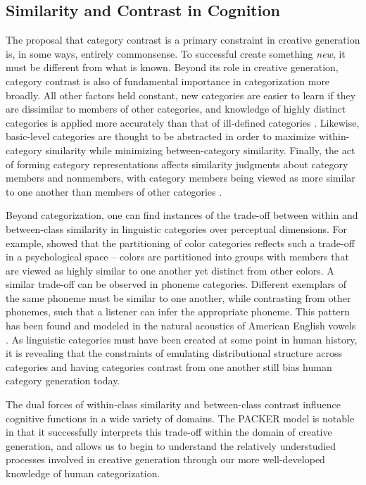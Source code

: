 \documentclass[12pt]{article}
\begin{document}
\begin{flushleft}
\subsection{Similarity and Contrast in Cognition}

The proposal that category contrast is a primary constraint in creative
generation is, in some ways, entirely commonsense. To successful create
something \textit{new}, it must be different from what is known. Beyond its role
in creative generation, category contrast is also of fundamental importance in
categorization more broadly. All other factors held constant, new categories are
easier to learn if they are dissimilar to members of other categories, and
knowledge of highly distinct categories is applied more accurately than that of
ill-defined categories \citep{ashby1994categorization,imai1965discriminability}.
Likewise, basic-level categories \citep{rosch1976basic} are thought to be
abstracted in order to maximize within-category similarity while minimizing
between-category similarity. Finally, the act of forming category
representations affects similarity judgments about category members and
nonmembers, with category members being viewed as more similar to one another
than members of other categories
\citep{goldstone1994influences,goldstone2001altering,goldstone1996isolated}.

Beyond categorization, one can find instances of the trade-off between within
and between-class similarity in linguistic categories over perceptual
dimensions. For example, \cite{regier2007} showed that the partitioning of color
categories reflects such a trade-off in a psychological space -- colors are
partitioned into groups with members that are viewed as highly similar to one
another yet distinct from other colors. A similar trade-off can be observed in
phoneme categories. Different exemplars of the same phoneme must be similar to
one another, while contrasting from other phonemes, such that a listener can
infer the appropriate phoneme. This pattern has been found and modeled in the
natural acoustics of American English vowels
\citep{feldman2013,hillenbrand1995}. As linguistic categories must have been
created at some point in human history, it is revealing that the constraints of
emulating distributional structure across categories and having categories
contrast from one another still bias human category generation today.

The dual forces of within-class similarity and between-class contrast influence
cognitive functions in a wide variety of domains. The PACKER model is notable in
that it successfully interprets this trade-off within the domain of creative
generation, and allows us to begin to understand the relatively understudied
processes involved in creative generation through our more well-developed
knowledge of human categorization.



\end{flushleft}
\end{document}
